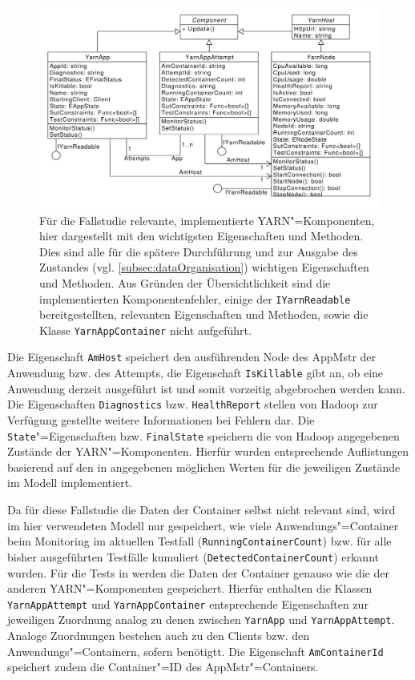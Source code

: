 \begin{figure}[h]
    \includegraphics[width=\columnwidth]{./resources/yarnComponents.pdf}
    \caption[Für die Fallstudie relevante, implementierte \acs{YARN}"=Komponenten]
        {Für die Fallstudie relevante, implementierte \acs{YARN}"=Komponenten, hier dargestellt mit den wichtigsten Eigenschaften und Methoden.
        Dies sind alle für die spätere Durchführung und zur Ausgabe des Zustandes (vgl. \cref{subsec:dataOrganisation}) wichtigen Eigenschaften und Methoden.
        Aus Gründen der Übersichtlichkeit sind die implementierten Komponentenfehler, einige der \texttt{IYarnReadable} bereitgestellten, relevanten Eigenschaften und Methoden, sowie die Klasse \texttt{YarnAppContainer} nicht aufgeführt.}
    \label{fig:yarnComponentsClassDiagram}
\end{figure}

Die Eigenschaft \texttt{AmHost} speichert den ausführenden Node des \ac{AppMstr} der Anwendung bzw. des Attempts, die Eigenschaft \texttt{IsKillable} gibt an, ob eine Anwendung derzeit ausgeführt ist und somit vorzeitig abgebrochen werden kann.
Die Eigenschaften \texttt{Diagnostics} bzw. \texttt{HealthReport} stellen von Hadoop zur Verfügung gestellte weitere Informationen bei Fehlern dar.
Die \texttt{State}"=Eigenschaften bzw. \texttt{FinalState} speichern die von Hadoop angegebenen Zustände der \ac{YARN}"=Komponenten.
Hierfür wurden entsprechende Auflistungen basierend auf den in \cite{HadoopRmApi271} angegebenen möglichen Werten für die jeweiligen Zustände im Modell implementiert.

Da für diese Fallstudie die Daten der Container selbst nicht relevant sind, wird im hier verwendeten Modell nur gespeichert, wie viele Anwendungs"=Container beim Monitoring im aktuellen Testfall (\texttt{RunningContainerCount}) bzw. für alle bisher ausgeführten Testfälle kumuliert (\texttt{DetectedContainerCount}) erkannt wurden.
Für die Tests in \cite{Eberhardinger2018} werden die Daten der Container genauso wie die der anderen \ac{YARN}"=Komponenten gespeichert.
Hierfür enthalten die Klassen \texttt{YarnAppAttempt} und \texttt{YarnAppContainer} entsprechende Eigenschaften zur jeweiligen Zuordnung analog zu denen zwischen \texttt{YarnApp} und \texttt{YarnAppAttempt}.
Analoge Zuordnungen bestehen auch zu den Clients bzw. den Anwendungs"=Containern, sofern benötigtt.
Die Eigenschaft \texttt{AmContainerId} speichert zudem die Container"=ID des \ac{AppMstr}"=Containers.

